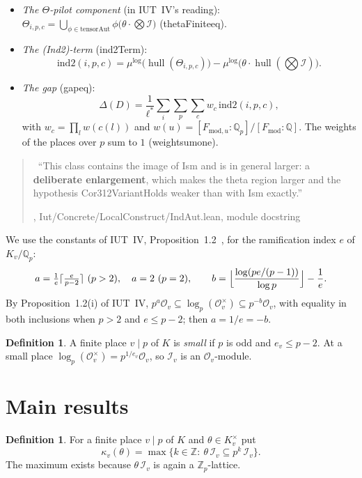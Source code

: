 \documentclass[11pt,a4paper]{article}
\newcommand{\Z}{\mathbb{Z}}
\newcommand{\Q}{\mathbb{Q}}
\newcommand{\Zp}{\mathbb{Z}_p}
\newcommand{\Qp}{\mathbb{Q}_p}
\newcommand{\I}{\mathcal{I}}
\newcommand{\Ocal}{\mathcal{O}}
\newcommand{\hull}{\operatorname{hull}}
\newcommand{\mulog}{\mu^{\log}}
\newcommand{\itwo}{\mathrm{ind2}}
\newcommand{\leanus}{\textunderscore\allowbreak}
\newcommand{\lean}[1]{{\ttfamily\let\_\leanus #1}}
\newcommand{\lab}[2]{{\upshape\fcolorbox{#1}{#1!8}{\scriptsize\sffamily\bfseries\textcolor{#1}{#2}}}}
\newcommand{\tagX}{\lab{Purple}{X}}
\newcommand{\xquote}[2]{\begin{quote}\small\tagX\ #1\par\nopagebreak\hfill{\footnotesize #2}\end{quote}}
\theoremstyle{plain}
\theoremstyle{definition}
\newtheorem{definition}[theorem]{Definition}
\theoremstyle{remark}
\begin{document}
\begin{itemize}
ramification index of $F_w/\Qp$ (\lean{ordp\_qrootOf}).
\item \emph{The $\Theta$-pilot component} (in IUT~IV's reading):
$\Theta_{i,p,c}=\bigcup_{\phi\in\mathrm{tensorAut}}\phi\bigl(\theta\cdot\bigotimes\I\bigr)$
(\lean{thetaFinite\_eq}).
\item \emph{The (Ind2)-term} (\lean{ind2Term}):
\[\itwo(i,p,c)=\mulog\bigl(\hull(\Theta_{i,p,c})\bigr)-\mulog\bigl(\theta\cdot\hull(\textstyle\bigotimes\I)\bigr).\]
\item \emph{The gap} (\lean{gap\_eq}):
\[\Delta(D)=\frac1{\ell^*}\sum_i\sum_p\sum_c w_c\,\itwo(i,p,c),\]
with $w_c=\prod_lw(c(l))$ and $w(u)=[F_{\mathrm{mod},u}:\Qp]/[F_{\mathrm{mod}}:\Q]$.
The weights of the places over $p$ sum to $1$ (\lean{weight\_sum\_one}).
\end{itemize}

\xquote{``This class contains the image of \lean{Ism} and is in general larger: a \textbf{deliberate enlargement},
which makes the theta region larger and the hypothesis \lean{Cor312VariantHolds} weaker than with \lean{Ism}
exactly.''}{\cite{lana}, \lean{Iut/Concrete/LocalConstruct/IndAut.lean}, module docstring}

We use the constants of IUT~IV, Proposition~1.2~\cite{IUT4}, for the ramification index $e$ of $K_v/\Qp$:
\[a=\tfrac1e\lceil\tfrac{e}{p-2}\rceil\ (p>2),\quad a=2\ (p=2),\qquad
b=\Bigl\lfloor\frac{\log(pe/(p-1))}{\log p}\Bigr\rfloor-\frac1e .\]
By Proposition~1.2(i) of IUT~IV, $p^a\Ocal_v\subseteq\log_p(\Ocal_v^\times)\subseteq p^{-b}\Ocal_v$, with equality
in both inclusions when $p>2$ and $e\le p-2$; then $a=1/e=-b$.

\begin{definition}
A finite place $v\mid p$ of $K$ is \emph{small} if $p$ is odd and $e_v\le p-2$. At a small place
$\log_p(\Ocal_v^\times)=p^{1/e_v}\Ocal_v$, so $\I_v$ is an $\Ocal_v$-module.
\end{definition}

\section{Main results}

\begin{definition}
For a finite place $v\mid p$ of $K$ and $\theta\in K_v^{\times}$ put
\[\kappa_v(\theta)=\max\{k\in\Z:\ \theta\,\I_v\subseteq p^k\,\I_v\}.\]
The maximum exists because $\theta\,\I_v$ is again a $\Zp$-lattice.
\end{definition}
\end{document}
